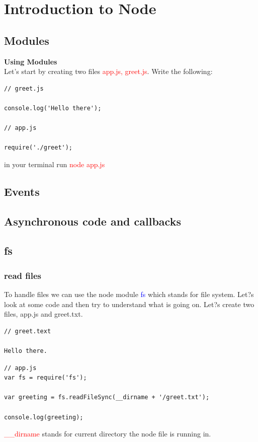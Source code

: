\documentclass[a4paper]{article}
\begin{document}
\maketitle


\tableofcontents


\section{Introduction to Node}
\subsection{Modules}
\textbf{Using Modules}\\
Let's start by creating two files \textcolor{red}{app.js, greet.js}. Write the following:

\begin{lstlisting}
// greet.js

console.log('Hello there');

// app.js

require('./greet');
\end{lstlisting}

in your terminal run  \textcolor{red}{node app.js}

\subsection{Events}


\subsection{Asynchronous code and callbacks}

\subsection{fs}

\subsubsection{read files}
To handle files we can use the node module \textcolor{blue}{fs} which stands for file system. Let?s look at some code and then try to understand what is going on. Let?s create two files, app.js and greet.txt.
\begin{lstlisting}
// greet.text

Hello there.
\end{lstlisting}
\begin{lstlisting}
// app.js
var fs = require('fs');

var greeting = fs.readFileSync(__dirname + '/greet.txt');

console.log(greeting);
\end{lstlisting}
\textcolor{red}{\_\_dirname} stands for current directory the node file is running in.\\
\end{document}
